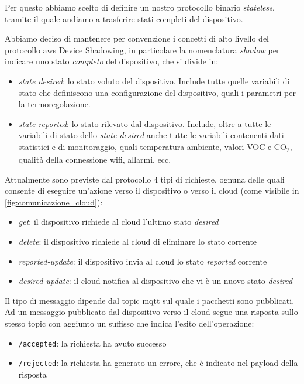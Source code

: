 \documentclass[12pt,a4paper,twoside,titlepage]{book}
\begin{document}
Per questo abbiamo scelto di definire un nostro protocollo binario \textit{stateless},
tramite il quale andiamo a trasferire stati completi del dispositivo.

Abbiamo deciso di mantenere per convenzione i concetti di alto livello del protocollo \Gls{aws}
Device Shadowing, in particolare la nomenclatura \textit{shadow} per indicare uno stato \textit{completo} del
dispositivo, che si divide in:
\begin{itemize}
    \item \textit{state desired}: lo stato voluto del dispositivo. Include tutte quelle variabili di stato 
        che definiscono una configurazione del dispositivo, quali i parametri per la termoregolazione.
    \item \textit{state reported}: lo stato rilevato dal dispositivo. Include, oltre a tutte le variabili 
        di stato dello \textit{state desired} anche tutte le variabili contenenti dati statistici e di monitoraggio,
        quali temperatura ambiente, valori VOC e CO\textsubscript{2}, qualità della connessione \Gls{wifi}, allarmi, ecc. 
\end{itemize}

Attualmente sono previste dal protocollo 4 tipi di richieste, ognuna delle quali consente di eseguire un'azione verso 
il dispositivo o verso il \gls{cloud} (come visibile in \autoref{fig:comunicazione_cloud}):

\begin{itemize}
    \item \textit{get}: il dispositivo richiede al \gls{cloud} l'ultimo stato \textit{desired}
    \item \textit{delete}: il dispositivo richiede al \gls{cloud} di eliminare lo stato corrente
    \item \textit{reported-update}: il dispositivo invia al \gls{cloud} lo stato \textit{reported} corrente
    \item \textit{desired-update}: il \gls{cloud} notifica al dispositivo che vi è un nuovo stato \textit{desired}
\end{itemize}

Il tipo di messaggio dipende dal \gls{topic} \Gls{mqtt} sul quale i pacchetti sono pubblicati. Ad
un messaggio pubblicato dal dispositivo verso il \gls{cloud} segue una risposta sullo stesso \gls{topic}
con aggiunto un suffisso che indica l'esito dell'operazione:
\begin{itemize}
    \item \texttt{/accepted}: la richiesta ha avuto successo
    \item \texttt{/rejected}: la richiesta ha generato un errore, che è indicato nel payload della risposta
\end{itemize}
\end{document}
